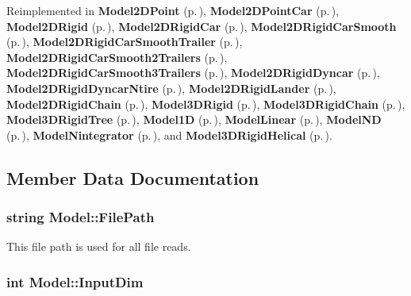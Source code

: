 Reimplemented in {\bf Model2DPoint} {\rm (p.\,\pageref{class_Model2DPoint_a3})}, {\bf Model2DPoint\-Car} {\rm (p.\,\pageref{class_Model2DPointCar_a3})}, {\bf Model2DRigid} {\rm (p.\,\pageref{class_Model2DRigid_a3})}, {\bf Model2DRigid\-Car} {\rm (p.\,\pageref{class_Model2DRigidCar_a2})}, {\bf Model2DRigid\-Car\-Smooth} {\rm (p.\,\pageref{class_Model2DRigidCarSmooth_a2})}, {\bf Model2DRigid\-Car\-Smooth\-Trailer} {\rm (p.\,\pageref{class_Model2DRigidCarSmoothTrailer_a2})}, {\bf Model2DRigid\-Car\-Smooth2Trailers} {\rm (p.\,\pageref{class_Model2DRigidCarSmooth2Trailers_a2})}, {\bf Model2DRigid\-Car\-Smooth3Trailers} {\rm (p.\,\pageref{class_Model2DRigidCarSmooth3Trailers_a2})}, {\bf Model2DRigid\-Dyncar} {\rm (p.\,\pageref{class_Model2DRigidDyncar_a4})}, {\bf Model2DRigid\-Dyncar\-Ntire} {\rm (p.\,\pageref{class_Model2DRigidDyncarNtire_a2})}, {\bf Model2DRigid\-Lander} {\rm (p.\,\pageref{class_Model2DRigidLander_a4})}, {\bf Model2DRigid\-Chain} {\rm (p.\,\pageref{class_Model2DRigidChain_a3})}, {\bf Model3DRigid} {\rm (p.\,\pageref{class_Model3DRigid_a3})}, {\bf Model3DRigid\-Chain} {\rm (p.\,\pageref{class_Model3DRigidChain_a2})}, {\bf Model3DRigid\-Tree} {\rm (p.\,\pageref{class_Model3DRigidTree_a2})}, {\bf Model1D} {\rm (p.\,\pageref{class_Model1D_a4})}, {\bf Model\-Linear} {\rm (p.\,\pageref{class_ModelLinear_a4})}, {\bf Model\-ND} {\rm (p.\,\pageref{class_ModelND_a4})}, {\bf Model\-Nintegrator} {\rm (p.\,\pageref{class_ModelNintegrator_a4})}, and {\bf Model3DRigid\-Helical} {\rm (p.\,\pageref{class_Model3DRigidHelical_a2})}.

\subsection{Member Data Documentation}
\subsubsection{\setlength{\rightskip}{0pt plus 5cm}string Model::File\-Path}\label{class_Model_m0}


This file path is used for all file reads.

\subsubsection{\setlength{\rightskip}{0pt plus 5cm}int Model::Input\-Dim}\label{class_Model_m6}



